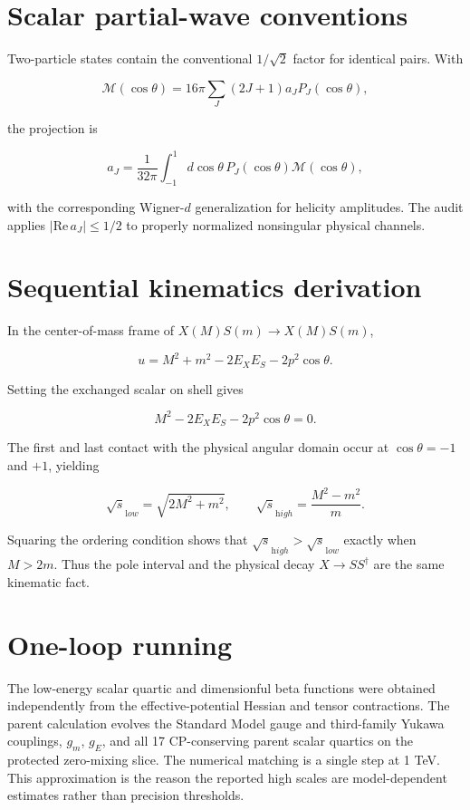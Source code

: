 \documentclass[
]{article}
\begin{document}
\hypertarget{scalar-partial-wave-conventions}{%
\section{Scalar partial-wave
conventions}\label{scalar-partial-wave-conventions}}

Two-particle states contain the conventional \(1/\sqrt2\) factor for
identical pairs. With

\[
\mathcal M(\cos\theta)=16\pi\sum_J(2J+1)a_JP_J(\cos\theta),
\]

the projection is

\[
a_J=\frac{1}{32\pi}\int_{-1}^{1}d\cos\theta\,
P_J(\cos\theta)\mathcal M(\cos\theta),
\]

with the corresponding Wigner-\(d\) generalization for helicity
amplitudes. The audit applies \(|\mathrm{Re}\,a_J|\leq1/2\) to properly
normalized nonsingular physical channels.

\hypertarget{sequential-kinematics-derivation}{%
\section{Sequential kinematics
derivation}\label{sequential-kinematics-derivation}}

In the center-of-mass frame of \(X(M)S(m)\to X(M)S(m)\),

\[
u=M^2+m^2-2E_XE_S-2p^2\cos\theta.
\]

Setting the exchanged scalar on shell gives

\[
M^2-2E_XE_S-2p^2\cos\theta=0.
\]

The first and last contact with the physical angular domain occur at
\(\cos\theta=-1\) and \(+1\), yielding

\[
\sqrt{s}_{\mathrm low}=\sqrt{2M^2+m^2},\qquad
\sqrt{s}_{\mathrm high}=\frac{M^2-m^2}{m}.
\]

Squaring the ordering condition shows that
\(\sqrt{s}_{\mathrm high}>\sqrt{s}_{\mathrm low}\) exactly when
\(M>2m\). Thus the pole interval and the physical decay
\(X\to SS^\dagger\) are the same kinematic fact.

\hypertarget{one-loop-running}{%
\section{One-loop running}\label{one-loop-running}}

The low-energy scalar quartic and dimensionful beta functions were
obtained independently from the effective-potential Hessian and tensor
contractions. The parent calculation evolves the Standard Model gauge
and third-family Yukawa couplings, \(g_m\), \(g_E\), and all 17
CP-conserving parent scalar quartics on the protected zero-mixing slice.
The numerical matching is a single step at 1 TeV. This approximation is
the reason the reported high scales are model-dependent estimates rather
than precision thresholds.
\end{document}
